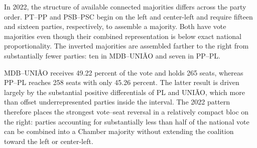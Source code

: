 \documentclass[11pt]{article}
\begin{document}
In 2022, the structure of available connected majorities differs across the
party order. PT--PP and PSB--PSC begin on the left and center-left and require
fifteen and sixteen parties, respectively, to assemble a majority. Both have
vote majorities even though their combined representation is below exact
national proportionality. The inverted majorities are assembled farther to
the right from substantially fewer parties: ten in MDB--UNI\~AO and seven in
PP--PL.


MDB--UNI\~AO receives 49.22 percent of the vote and holds 265 seats, whereas
PP--PL reaches 258 seats with only 45.26 percent. The latter result is driven
largely by the substantial positive differentials of PL and UNI\~AO, which
more than offset underrepresented parties inside the interval. The 2022
pattern therefore places the strongest vote--seat reversal in a relatively
compact bloc on the right: parties accounting for substantially less than half
of the national vote can be combined into a Chamber majority without extending
the coalition toward the left or center-left.
\end{document}
